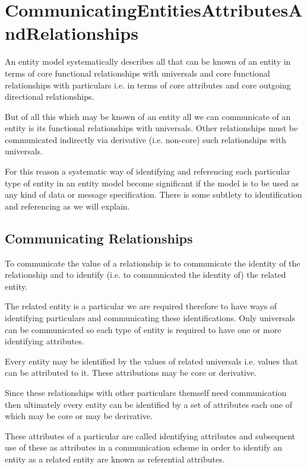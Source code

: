 \section{CommunicatingEntitiesAttributesAndRelationships}
\label{CommunicatingEntitiesAttributesAndRelationships}

\mynote An entity model systematically describes all that can be known of an entity
in terms of core functional relationships with universals and core functional relationships with particulars i.e. in terms of core attributes and core outgoing directional relationships.

\mynote But of all this which  may be known of an entity all we can communicate of an entity is its functional relationships with universals. Other relationships must be communicated indirectly via derivative (i.e. non-core) such relationships with universals. 

\mynote For this reason a systematic way of identifying and referencing each particular type  of entity in an entity model become significant if the model is to be used as any kind of data or message specification. There is some subtlety to identification and referencing as we will explain.

\subsection*{Communicating Relationships}
\mynote To communicate the value of a relationship is to communicate the identity of the relationship and  to identify (i.e. to communicated the identity of) the related entity. 

\mynote The related entity is a particular we are required therefore to have ways of identifying particulars and communicating these identifications.  
Only universals can be communicated so each type of entity is required 
to have one or more identifying attributes. 

\mynote Every entity may be identified by the values of related universals i.e. values that can be attributed to it. These attributions  may be core or derivative.

\mynote Since these relationships with other particulars themself need communication then ultimately every entity can be identified by a set of attributes each one of which may be core or may be derivative.  

\mynote
These attributes of a particular are called identifying attributes and subsequent use of these as attributes in a communication scheme in order to identify an entity as a related entity are known as referential attributes. 

